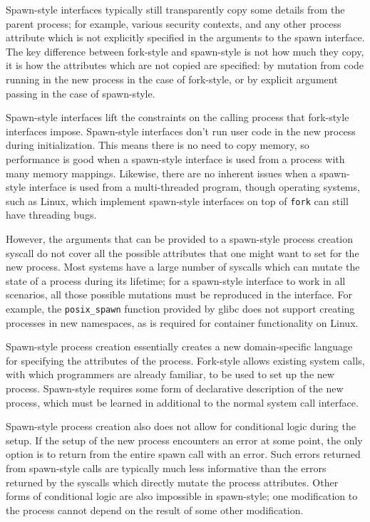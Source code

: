 \documentclass[letterpaper,twocolumn,10pt]{article}
\begin{document}
Spawn-style interfaces typically still transparently copy some details from the parent process;
for example, various security contexts,
and any other process attribute which is not explicitly specified in the arguments to the spawn interface.
The key difference between fork-style and spawn-style is not how much they copy,
it is how the attributes which are not copied are specified:
by mutation from code running in the new process in the case of fork-style,
or by explicit argument passing in the case of spawn-style.

Spawn-style interfaces lift the constraints on the calling process that fork-style interfaces impose.
Spawn-style interfaces don't run user code in the new process during initialization.
This means there is no need to copy memory,
so performance is good when a spawn-style interface is used from a process with many memory mappings.
Likewise, there are no inherent issues when a spawn-style interface is used from a multi-threaded program,
though operating systems, such as Linux,
which implement spawn-style interfaces on top of \texttt{fork} can still have threading bugs.

However, the arguments that can be provided to a spawn-style process creation syscall
do not cover all the possible attributes that one might want to set for the new process.
Most systems have a large number of syscalls which can mutate the state of a process during its lifetime;
for a spawn-style interface to work in all scenarios,
all those possible mutations must be reproduced in the interface.
For example, the \texttt{posix\_spawn} function provided by glibc does not support creating processes in new namespaces,
as is required for container functionality on Linux.

Spawn-style process creation
essentially creates a new domain-specific language for specifying the attributes of the process.
Fork-style allows existing system calls,
with which programmers are already familiar,
to be used to set up the new process.
Spawn-style requires some form of declarative description of the new process,
which must be learned in additional to the normal system call interface.

Spawn-style process creation also does not allow for conditional logic during the setup.
If the setup of the new process encounters an error at some point,
the only option is to return from the entire spawn call with an error.
Such errors returned from spawn-style calls
are typically much less informative
than the errors returned by the syscalls which directly mutate the process attributes.
Other forms of conditional logic are also impossible in spawn-style;
one modification to the process cannot depend on the result of some other modification.
\end{document}
